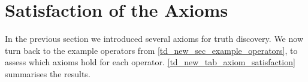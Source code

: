

\section{Satisfaction of the Axioms}
\label{td_new_sec_satisfaction_of_the_axioms}

In the previous section we introduced several axioms for truth discovery. We
now turn back to the example operators from
\cref{td_new_sec_example_operators}, to assess which axioms hold for each
operator. \cref{td_new_tab_axiom_satisfaction} summarises the results.

